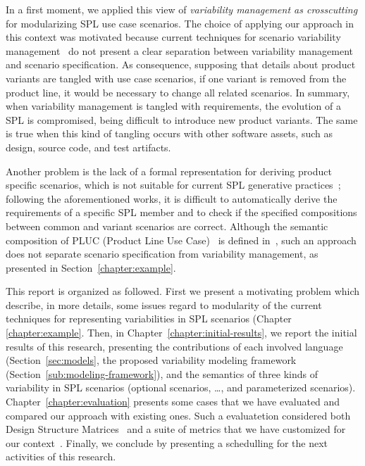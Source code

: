 \documentclass[11pt]{report}
\begin{document}
\hrulefill


In a first moment, we applied this view of \emph{variability management as
crosscutting} for modularizing SPL use case scenarios. The choice of applying our
approach in this context was motivated because current techniques for scenario
variability 
management~\cite{favaro-icsr-98,bertolino-esec-2003,eriksson-splc-2005} do not
present a clear separation between variability management and scenario
specification. As consequence, supposing that details about product variants are
tangled with  use case scenarios, if one variant is removed from the product
line, it would be necessary to change all related scenarios. In summary, when
variability management is tangled with requirements, the evolution of a SPL is
compromised, being difficult to introduce new product variants. The same is true
when this kind of tangling occurs with other software assets, such as design,
source code, and test artifacts.

Another problem is the lack of a formal representation for deriving product
specific scenarios, which is not suitable for current SPL generative
practices~\cite{krueger-cacm-200712}; following the aforementioned works, it is
difficult to automatically derive the requirements of a specific SPL member and
to check if the specified compositions between common and variant scenarios are
correct.  Although  the semantic composition of PLUC (Product Line Use
Case)~\cite{bertolino-esec-2003} is defined in~\cite{fantechi-splc-2004}, such an
approach does not separate scenario specification from variability management, as
presented in Section~\ref{chapter:example}.

This report is organized as followed. First we present a motivating problem
which describe, in more details, some issues regard to modularity of the
current techniques for representing variabilities in SPL
scenarios (Chapter \ref{chapter:example}. Then, in
Chapter~\ref{chapter:initial-results}, we report the initial results of
this research, presenting the contributions of each involved language
(Section~\ref{sec:models}, the proposed variability modeling framework
(Section~\ref{sub:modeling-framework}), and the semantics of three kinds of
variability in SPL scenarios (optional scenarios, \ldots, and parameterized
scenarios). Chapter~\ref{chapter:evaluation} presents some cases that we have
evaluated and compared our approach with existing ones. Such a evaluatetion
considered both Design Structure Matrices~\cite{clark-design-rules-book} and a
suite of metrics that we have customized for our
context~\cite{rbonifacio-ea-2008}. Finally, we conclude by presenting a
schedulling for the next activities of this research.
\end{document}
